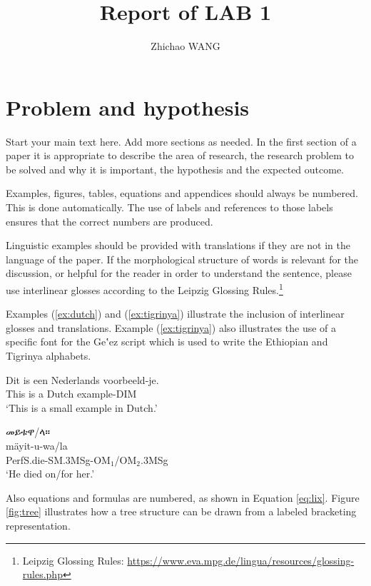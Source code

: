 \documentclass[a4paper,12pt]{article}
\title{Report of LAB 1} %
\author{Zhichao WANG} %
\newcommand{\tig}[1] {\fontspec{Abyssinica SIL} #1} %
\begin{document}
 \maketitle

\section{Problem and hypothesis} \label{sec:intro}
Start your main text here.
Add more sections as needed.
In the first section of a paper it is appropriate to describe the area of research, the research problem to be solved and why it is important, the hypothesis and the expected outcome.

Examples, figures, tables, equations and appendices should always be numbered.
This is done automatically.
The use of labels and references to those labels ensures that the correct numbers are produced.

Linguistic examples should be provided with translations if they are not in the language of the paper.
If the morphological structure of words is relevant for the discussion, or helpful for the reader in order to understand the sentence, please use interlinear glosses according to the Leipzig Glossing Rules.\footnote{Leipzig Glossing Rules: \url{https://www.eva.mpg.de/lingua/resources/glossing-rules.php}}

Examples (\ref{ex:dutch}) and (\ref{ex:tigrinya}) illustrate the inclusion of interlinear glosses and translations.
Example (\ref{ex:tigrinya}) also illustrates the use of a specific font for the Ge‛ez script which is used to write the Ethiopian and Tigrinya alphabets. 

\begin{exe}
\ex \label{ex:dutch}
\gll Dit is een Nederlands voorbeeld-je.\\
This is a Dutch example-DIM\\
\trans `This is a small example in Dutch.'

\ex \label{ex:tigrinya}
\glll \tig{መይቱዋ/ላ።}\\
mäyit-u-wa/la\\
PerfS.die-SM.3MSg-OM$_1$/OM$_2$.3MSg\\ %
\trans ‘He died on/for her.’
\end{exe}

Also equations and formulas are numbered, as shown in Equation \ref{eq:lix}.
Figure \ref{fig:tree} illustrates how a tree structure can be drawn from a labeled bracketing representation.
\end{document}

